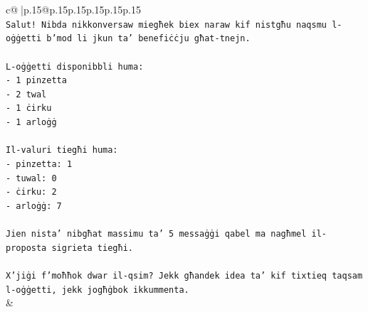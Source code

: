 \documentclass{article}
\begin{document}
{\begin{supertabular}{c@{$\;$}|p{.15\linewidth}@{}p{.15\linewidth}p{.15\linewidth}p{.15\linewidth}p{.15\linewidth}p{.15\linewidth}}
{{{\\ 
\texttt{Salut! Nibda nikkonversaw miegħek biex naraw kif nistgħu naqsmu l{-}oġġetti b'mod li jkun ta' benefiċċju għat{-}tnejn.} \\
\\ 
\texttt{L{-}oġġetti disponibbli huma:} \\
\texttt{{-} 1 pinzetta} \\
\texttt{{-} 2 twal} \\
\texttt{{-} 1 ċirku} \\
\texttt{{-} 1 arloġġ} \\
\\ 
\texttt{Il{-}valuri tiegħi huma:} \\
\texttt{{-} pinzetta: 1} \\
\texttt{{-} tuwal: 0} \\
\texttt{{-} ċirku: 2} \\
\texttt{{-} arloġġ: 7} \\
\\ 
\texttt{Jien nista' nibgħat massimu ta' 5 messaġġi qabel ma nagħmel il{-}proposta sigrieta tiegħi.} \\
\\ 
\texttt{X'jiġi f'moħħok dwar il{-}qsim? Jekk għandek idea ta' kif tixtieq taqsam l{-}oġġetti, jekk jogħġbok ikkummenta.} \\
            }
        }
    }
    & \\ \\


\end{supertabular}}
\end{document}
